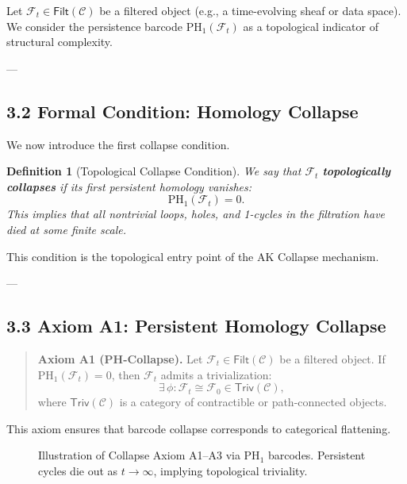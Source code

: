\documentclass[11pt]{article}
\newtheorem{definition}[theorem]{Definition}
\begin{document}
Let \( \mathcal{F}_t \in \mathsf{Filt}(\mathcal{C}) \) be a filtered object (e.g., a time-evolving sheaf or data space).  
We consider the persistence barcode \( \mathrm{PH}_1(\mathcal{F}_t) \) as a topological indicator of structural complexity.

---

\subsection*{3.2 Formal Condition: Homology Collapse}

We now introduce the first collapse condition.

\begin{definition}[Topological Collapse Condition]
We say that \( \mathcal{F}_t \) \textbf{topologically collapses} if its first persistent homology vanishes:
\[
\mathrm{PH}_1(\mathcal{F}_t) = 0.
\]
This implies that all nontrivial loops, holes, and 1-cycles in the filtration have died at some finite scale.
\end{definition}

This condition is the topological entry point of the AK Collapse mechanism.

---

\subsection*{3.3 Axiom A1: Persistent Homology Collapse}

\begin{quote}
\textbf{Axiom A1 (PH-Collapse).}  
Let \( \mathcal{F}_t \in \mathsf{Filt}(\mathcal{C}) \) be a filtered object.  
If \( \mathrm{PH}_1(\mathcal{F}_t) = 0 \), then \( \mathcal{F}_t \) admits a trivialization:
\[
\exists \, \phi: \mathcal{F}_t \cong \mathcal{F}_0 \in \mathsf{Triv}(\mathcal{C}),
\]
where \( \mathsf{Triv}(\mathcal{C}) \) is a category of contractible or path-connected objects.
\end{quote}

This axiom ensures that barcode collapse corresponds to categorical flattening.

\begin{figure}[h]
\centering
{}
\caption{Illustration of Collapse Axiom A1–A3 via PH$_1$ barcodes. Persistent cycles die out as $t \to \infty$, implying topological triviality.}
\end{figure}
\end{document}
